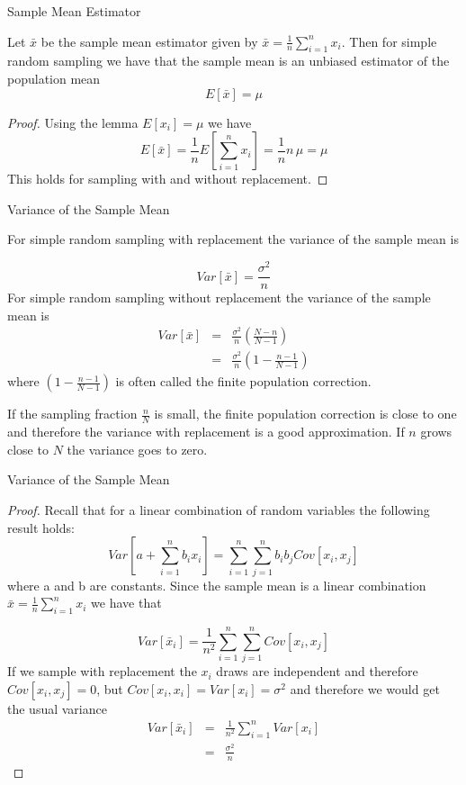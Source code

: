 \documentclass{beamer}
\numberwithin{equation}{section}
\begin{document}
\begin{frame}{Sample Mean Estimator}
\scriptsize

\begin{theorem}
Let $\bar{x}$ be the sample mean estimator given by $\bar{x}= \frac{1}{n} \sum_{i=1}^n x_i$. Then for simple random sampling we have that the sample mean is an unbiased estimator of the population mean
$$
E[\bar{x}]=\mu
$$
\end{theorem}
\begin{proof}
Using the lemma $E[x_i]=\mu$ we have 
$$
E[\bar{x}] = \frac{1}{n} E[\sum_{i=1}^n x_i]=\frac{1}{n} n\, \mu=\mu
$$
This holds for sampling with and without replacement.
\end{proof}
\end{frame}

\begin{frame}{Variance of the Sample Mean}
\scriptsize

\begin{theorem}
For simple random sampling with replacement the variance of the sample mean is

$$
Var[\bar{x}]=\frac{\sigma^2}{n}
$$
For simple random sampling without replacement the variance of the sample mean is
\begin{eqnarray}
Var[\bar{x}]&=&\frac{\sigma^2}{n} \left( \frac{N-n}{N-1} \right)\\
  &=& \frac{\sigma^2}{n} \left(1- \frac{n-1}{N-1} \right) 
\end{eqnarray}
where $\left(1- \frac{n-1}{N-1} \right)$ is often called the finite population correction.\\\bigskip

If the sampling fraction $\frac{n}{N}$ is small, the finite population correction is close to one and therefore the variance with replacement is a good approximation. If $n$ grows close to $N$ the variance goes to zero.
\end{theorem}
\end{frame}

\begin{frame}{Variance of the Sample Mean}
\scriptsize

\begin{proof}
Recall that for a linear combination of random variables the following result holds:
$$
Var[a+\sum_{i=1}^n b_i x_i] = \sum_{i=1}^n \sum_{j=1}^n b_i b_j Cov[x_i,x_j]
$$
where a and b are constants. Since the sample mean is a linear combination $\bar{x}= \frac{1}{n} \sum_{i=1}^n x_i$ we have that 

$$
Var[\bar{x}_i]=\frac{1}{n^2} \sum_{i=1}^n \sum_{j=1}^n  Cov[x_i,x_j]
$$
If we sample with replacement the $x_i$ draws are independent and therefore $ Cov[x_i,x_j]=0$, but  $Cov[x_i,x_i]=Var[x_i]=\sigma^2$ and therefore we would get  the usual variance
\begin{eqnarray}
Var[\bar{x}_i]&=&\frac{1}{n^2} \sum_{i=1}^n Var[x_i]  \\
  &=& \frac{\sigma^2}{n}
\end{eqnarray}
\end{proof}

\end{frame}
\end{document}

